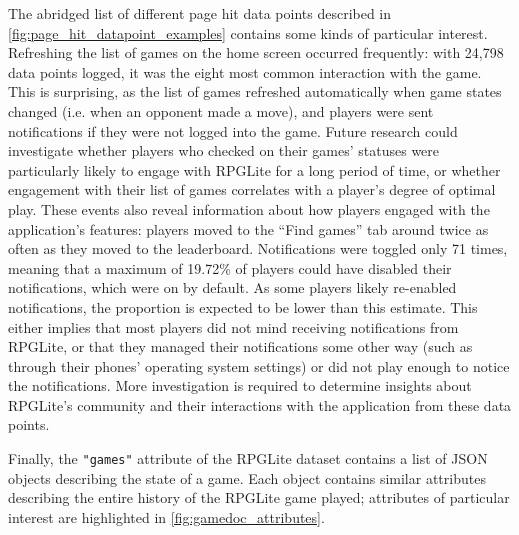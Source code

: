 The abridged list of different page hit data points described in
\cref{fig:page_hit_datapoint_examples} contains some kinds of particular
interest. Refreshing the list of games on the home screen occurred frequently:
with 24,798 data points logged, it was the eight most common interaction with
the game. This is surprising, as the list of games refreshed automatically when
game states changed (i.e. when an opponent made a move), and players were sent
notifications if they were not logged into the game. Future research could
investigate whether players who checked on their games' statuses were
particularly likely to engage with RPGLite for a long period of time, or whether
engagement with their list of games correlates with a player's degree of optimal
play. These events also reveal information about how players engaged with the
application's features: players moved to the ``Find games'' tab around twice as
often as they moved to the leaderboard. Notifications were toggled only 71
times, meaning that a maximum of 19.72\% of players could have disabled their
notifications, which were on by default. As some players likely re-enabled
notifications, the proportion is expected to be lower than this estimate. This
either implies that most players did not mind receiving notifications from
RPGLite, or that they managed their notifications some other way (such as
through their phones' operating system settings) or did not play enough to
notice the notifications. More investigation is required to determine insights
about RPGLite's community and their interactions with the application from these
data points.

Finally, the \lstinline{"games"} attribute of the RPGLite dataset contains a
list of JSON objects describing the state of a game. Each object contains
similar attributes describing the entire history of the RPGLite game played;
attributes of particular interest are highlighted in
\cref{fig:gamedoc_attributes}. 

